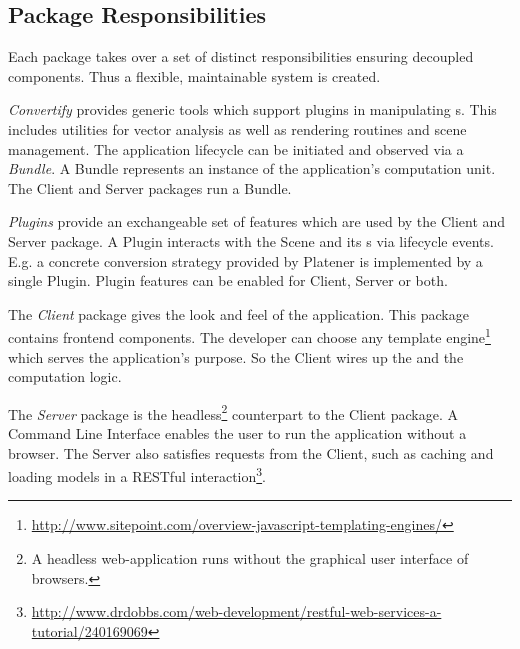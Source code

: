 \documentclass[../ClassicThesis.tex]{subfiles}
\begin{document}

\subsection{Package Responsibilities}

Each package takes over a set of distinct responsibilities ensuring decoupled
components. Thus a flexible, maintainable system is created.

\emph{Convertify} provides generic tools which support plugins in manipulating
{\threedmodel}s. This includes utilities for vector analysis as well as
rendering routines and scene management. The application lifecycle can be
initiated and observed via a \emph{Bundle}. A Bundle represents an instance of
the application's computation unit. The Client and Server packages run a Bundle.

\emph{Plugins} provide an exchangeable set of features which are used by the
Client and Server package. A Plugin interacts with the Scene and its
{\threedmodel}s via lifecycle events. E.g. a concrete conversion strategy
provided by Platener is implemented by a single Plugin. Plugin features can be
enabled for Client, Server or both.

The \emph{Client} package gives the look and feel of the application. This
package contains frontend components. The developer can choose any template
engine\footnote{\url{http://www.sitepoint.com/overview-javascript-templating-engines/}}
which serves the application's purpose. So the Client wires up the
{\userinterface} and the computation logic.

The \emph{Server} package is the headless\footnote{A headless web-application
  runs without the graphical user interface of browsers.} counterpart to the
Client package. A Command Line Interface enables the user to run the application
without a browser. The Server also satisfies requests from the Client, such as
caching and loading models in a RESTful
interaction\footnote{\url{http://www.drdobbs.com/web-development/restful-web-services-a-tutorial/240169069}}.
\end{document}
